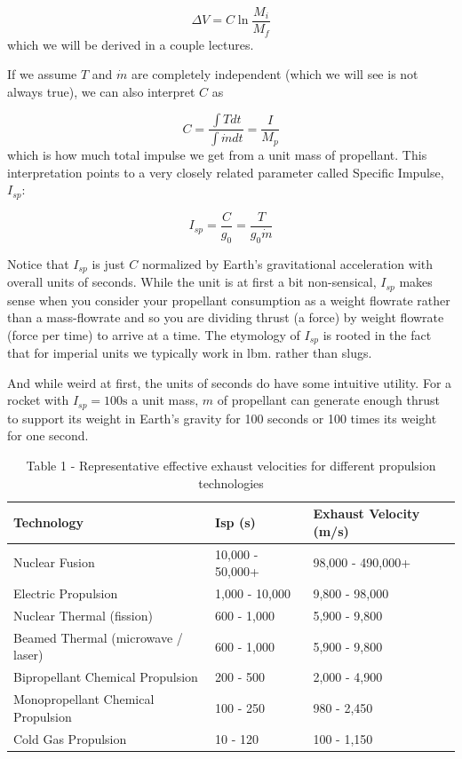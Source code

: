 \documentclass[twocolumn]{memoir} %
\begin{document}
\begin{equation}\Delta V = C \ln \frac{M_i}{M_f}
\end{equation}
%
which we will be derived in a couple lectures.

If we assume $T$ and $\dot{m}$ are completely independent (which we
will see is not always true), we can also interpret $C$ as

\begin{equation}C = \frac{\int T dt}{\int \dot{m} dt} = \frac{I}{M_p}
\end{equation}
%
which is how much total impulse we get from a unit mass of propellant.
This interpretation points to a very closely related parameter called
Specific Impulse, $I_{sp}$:

\begin{equation}I_{sp} = \frac{C}{g_0} = \frac{T}{g_0\dot{m}}
\end{equation}

Notice that $I_{sp}$ is just $C$ normalized by Earth's gravitational
acceleration with overall units of seconds. While the unit is at first a bit
non-sensical, $I_{sp}$ makes sense when you consider your propellant
consumption as a weight flowrate rather than a mass-flowrate and so you
are dividing thrust (a force) by weight flowrate (force per time) to
arrive at a time. The etymology of $I_{sp}$ is rooted in the fact that
for imperial units we typically work in lbm. rather than slugs.

And while weird at first, the units of seconds do have some intuitive
utility. For a rocket with $I_{sp} = 100 \text{s}$ a unit mass, $m$
of propellant can generate enough thrust to support its weight in Earth's
gravity for 100 seconds or 100 times its weight for one second.

\begin{table}[h]
    \centering
    \begin{tabular}{lll}
    \toprule
    Technology                    & Isp (s)        & Exhaust Velocity (m/s)  \\
    \midrule
    Nuclear Fusion                & 10,000 - 50,000+ & 98,000 - 490,000+ \\
    Electric Propulsion           & 1,000 - 10,000  & 9,800 - 98,000  \\
    Nuclear Thermal (fission)     & 600 - 1,000  & 5,900 - 9,800  \\
    Beamed Thermal (microwave / laser)   & 600 - 1,000  & 5,900 - 9,800  \\
    Bipropellant Chemical Propulsion           & 200 - 500    & 2,000 - 4,900  \\
    Monopropellant Chemical Propulsion         & 100 - 250    & 980 - 2,450  \\
    Cold Gas Propulsion                        & 10 - 120     & 100 - 1,150  \\
    \bottomrule
    \end{tabular}
\caption{Table 1 - Representative effective exhaust velocities for different propulsion technologies}
\label{t:tech_c}
\end{table}
\end{document}
